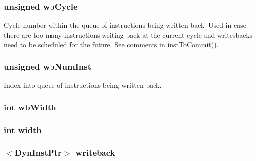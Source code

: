 \label{classBackEnd_ae3e32acce8acd38434b6efd36ea6198e}
\hypertarget{classBackEnd_ad2c7b2687f864f2b7359eb393276996f}{
\subsubsection[{wbCycle}]{\setlength{\rightskip}{0pt plus 5cm}unsigned {\bf wbCycle}}}
\label{classBackEnd_ad2c7b2687f864f2b7359eb393276996f}
Cycle number within the queue of instructions being written back. Used in case there are too many instructions writing back at the current cycle and writesbacks need to be scheduled for the future. See comments in \hyperlink{classBackEnd_a720e9865ffa6e84b756f5ec1d1a24d94}{instToCommit()}. \hypertarget{classBackEnd_a5fa0799bf5569437190dd1eda1d62b7b}{
\subsubsection[{wbNumInst}]{\setlength{\rightskip}{0pt plus 5cm}unsigned {\bf wbNumInst}}}
\label{classBackEnd_a5fa0799bf5569437190dd1eda1d62b7b}
Index into queue of instructions being written back. \hypertarget{classBackEnd_a20d3086e6bcdc826d99143ac7c9b23a4}{
\subsubsection[{wbWidth}]{\setlength{\rightskip}{0pt plus 5cm}int {\bf wbWidth}}}
\label{classBackEnd_a20d3086e6bcdc826d99143ac7c9b23a4}
\hypertarget{classBackEnd_a2474a5474cbff19523a51eb1de01cda4}{
\subsubsection[{width}]{\setlength{\rightskip}{0pt plus 5cm}int {\bf width}}}
\label{classBackEnd_a2474a5474cbff19523a51eb1de01cda4}
\hypertarget{classBackEnd_ae4b76f4612be07d13b349e13ee9dfa16}{
\subsubsection[{writeback}]{$<${\bf DynInstPtr}$>$ {\bf writeback}}}
